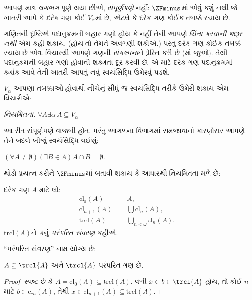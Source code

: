 \begingroup
\makeatletter{}\makeatother


\label{guunit:OLP-0562}


આપણે માત્ર \emph{લગભગ} પૂર્ણ થયા છીએ, \emph{સંપૂર્ણપણે}
નહીં: $\ZFminus$માં એવું કશું નથી જે ખાતરી આપે કે
\emph{દરેક} ગણ કોઈ $V_\alpha$માં છે, એટલે કે દરેક ગણ કોઈક
તબક્કે રચાય છે.

ગણિતની દૃષ્ટિએ પદાનુક્રમની બહાર ગણો હોય કે નહીં તેની આપણે
\emph{ચિંતા કરવાની જરૂર નથી} એમ કહી શકાય. (હોય તો તેમને
અવગણી શકીએ.) પરંતુ દરેક ગણ કોઈક તબક્કે રચાય છે એવા વિચારથી
આપણે ગણની \emph{સંકલ્પના}ને પ્રેરિત કરી છે
(માં \stageshier{} જુઓ). તેથી
પદાનુક્રમની બહાર ગણો હોવાની શક્યતા દૂર કરવી છે. એ માટે
દરેક ગણ પદાનુક્રમમાં ક્યાંક આવે તેની ખાતરી આપતું નવું
સ્વયંસિદ્ધિ ઉમેરવું પડશે.

$V_\alpha$ આપણા તબક્કાઓ હોવાથી નીચેનું સીધું જ સ્વયંસિદ્ધિ
તરીકે ઉમેરી શકાય એમ વિચારીએ:

\begin{defish}
\emph{નિયમિતતા.} $\forall A \exists \alpha\, A \subseteq V_\alpha$
\end{defish}

આ રીત સંપૂર્ણપણે વાજબી હોત. પરંતુ આગળના વિભાગમાં સમજાવાનાં
કારણોસર આપણે તેને બદલે બીજું સ્વયંસિદ્ધિ લઈશું:

\begin{axiom}[આધાર]
$(\forall A \neq \emptyset)(\exists B \in A)A \cap B = \emptyset$.
\end{axiom}

થોડો પ્રયત્ન કરીને $\ZFminus$માં બતાવી શકાય કે આધારથી
નિયમિતતા મળે છે:
\begin{defn}
દરેક ગણ $A$ માટે લો:
\begin{align*}
	\text{cl}_0(A) &= A,\\
	\text{cl}_{n+1}(A) &= \bigcup \text{cl}_n(A),\\
	\text{trcl}(A) &= \bigcup_{n < \omega} \text{cl}_{n}(A).
\end{align*}
$\text{trcl}(A)$ને $A$નું \emph{પરંપરિત સંવરણ} કહીએ.
\end{defn}
\noindent
``પરંપરિત સંવરણ'' નામ યોગ્ય છે:
\begin{prop}
$A \subseteq \trcl{A}$ અને $\trcl{A}$ પરંપરિત ગણ છે.
\end{prop}

\begin{proof}
સ્પષ્ટ છે કે $A = \text{cl}_0(A) \subseteq \text{trcl}(A)$.
વળી $x
\in b \in \trcl{A}$ હોય, તો કોઈ $n$ માટે
$b \in \text{cl}_n(A)$, તેથી $x
\in \text{cl}_{n+1}(A) \subseteq \text{trcl}(A)$.
\end{proof}

